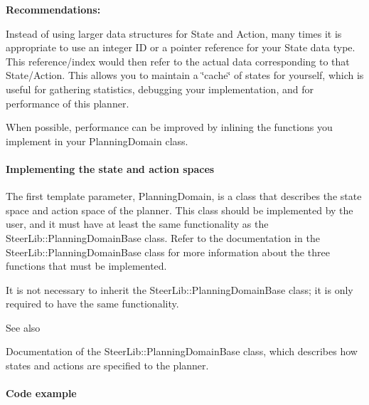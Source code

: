 {\bfseries  Recommendations\-: }


\begin{DoxyItemize}
\item Instead of using larger data structures for State and Action, many times it is appropriate to use an integer I\-D or a pointer reference for your State data type. This reference/index would then refer to the actual data corresponding to that State/\-Action. This allows you to maintain a \char`\"{}cache\char`\"{} of states for yourself, which is useful for gathering statistics, debugging your implementation, and for performance of this planner.
\end{DoxyItemize}


\begin{DoxyItemize}
\item When possible, performance can be improved by inlining the functions you implement in your Planning\-Domain class.
\end{DoxyItemize}

\paragraph*{Implementing the state and action spaces }

The first template parameter, Planning\-Domain, is a class that describes the state space and action space of the planner. This class should be implemented by the user, and it must have at least the same functionality as the Steer\-Lib\-::\-Planning\-Domain\-Base class. Refer to the documentation in the Steer\-Lib\-::\-Planning\-Domain\-Base class for more information about the three functions that must be implemented.

It is not necessary to inherit the Steer\-Lib\-::\-Planning\-Domain\-Base class; it is only required to have the same functionality.

\begin{DoxySeeAlso}{See also}

\begin{DoxyItemize}
\item Documentation of the Steer\-Lib\-::\-Planning\-Domain\-Base class, which describes how states and actions are specified to the planner.
\end{DoxyItemize}
\end{DoxySeeAlso}
\paragraph*{Code example }



